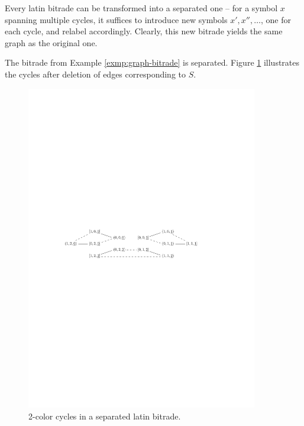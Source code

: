 Every latin bitrade can be transformed into a separated one -- for a symbol $x$ spanning multiple cycles, it suffices to introduce new symbols $x', x'', \dots$, one for each cycle, and relabel accordingly. Clearly, this new bitrade yields the same graph as the original one.

\begin{exmp}
The bitrade from Example \ref{exmp:graph-bitrade} is separated. Figure \ref{fig:separated-graph} illustrates the cycles after deletion of edges corresponding to $S$.

\begin{figure}[htb]
\centering
\includegraphics[width=0.9\textwidth]{img/separated.pdf}
\caption{2-color cycles in a separated latin bitrade.}
\label{fig:separated-graph}
\end{figure}
\end{exmp}%


